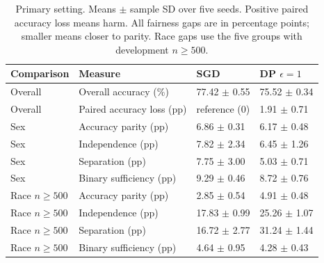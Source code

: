 \begin{table}[t]
\centering
\small
\setlength{\tabcolsep}{3pt}
\begin{tabular}{llll}
\toprule
Comparison & Measure & SGD & DP $\epsilon=1$ \\
\midrule
Overall & Overall accuracy (\%) & 77.42 $\pm$ 0.55 & 75.52 $\pm$ 0.34 \\
Overall & Paired accuracy loss (pp) & reference (0) & 1.91 $\pm$ 0.71 \\
Sex & Accuracy parity (pp) & 6.86 $\pm$ 0.31 & 6.17 $\pm$ 0.48 \\
Sex & Independence (pp) & 7.82 $\pm$ 2.34 & 6.45 $\pm$ 1.26 \\
Sex & Separation (pp) & 7.75 $\pm$ 3.00 & 5.03 $\pm$ 0.71 \\
Sex & Binary sufficiency (pp) & 9.29 $\pm$ 0.46 & 8.72 $\pm$ 0.76 \\
Race $n\geq500$ & Accuracy parity (pp) & 2.85 $\pm$ 0.54 & 4.91 $\pm$ 0.48 \\
Race $n\geq500$ & Independence (pp) & 17.83 $\pm$ 0.99 & 25.26 $\pm$ 1.07 \\
Race $n\geq500$ & Separation (pp) & 16.72 $\pm$ 2.77 & 31.24 $\pm$ 1.44 \\
Race $n\geq500$ & Binary sufficiency (pp) & 4.64 $\pm$ 0.95 & 4.28 $\pm$ 0.43 \\
\bottomrule
\end{tabular}
\caption{Primary setting. Means $\pm$ sample SD over five seeds. Positive paired accuracy loss means harm. All fairness gaps are in percentage points; smaller means closer to parity. Race gaps use the five groups with development $n\geq500$.}
\label{tab:sgd-dp1}
\end{table}
